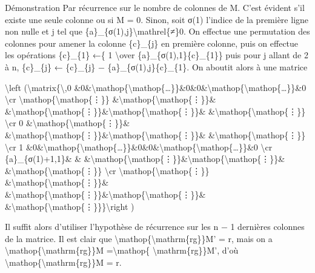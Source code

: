 \documentclass[]{article}
\begin{document}
Démonstration Par récurrence sur le nombre de colonnes de M. C'est
évident s'il existe une seule colonne ou si M = 0. Sinon, soit σ(1)
l'indice de la première ligne non nulle et j tel que
\{a\}\_\{σ(1),j\}\textbackslash{}mathrel\{≠\}0. On effectue une
permutation des colonnes pour amener la colonne \{c\}\_\{j\} en première
colonne, puis on effectue les opérations \{c\}\_\{1\} ←\{ 1
\textbackslash{}over \{a\}\_\{σ(1),1\}\{c\}\_\{1\}\} puis pour j allant
de 2 à n, \{c\}\_\{j\} ← \{c\}\_\{j\} − \{a\}\_\{σ(1),j\}\{c\}\_\{1\}.
On aboutit alors à une matrice

\textbackslash{}left (\textbackslash{}matrix\{\textbackslash{},0
\&0\&\textbackslash{}mathop\{\textbackslash{}mathop\{\ldots{}\}\}\&0\&0\&\textbackslash{}mathop\{\textbackslash{}mathop\{\ldots{}\}\}\&0
\textbackslash{}cr \textbackslash{}mathop\{\textbackslash{}mathop\{⋮\}\}
\&\textbackslash{}mathop\{\textbackslash{}mathop\{⋮\}\}\&
\&\textbackslash{}mathop\{\textbackslash{}mathop\{⋮\}\}\&\textbackslash{}mathop\{\textbackslash{}mathop\{⋮\}\}\&
\&\textbackslash{}mathop\{\textbackslash{}mathop\{⋮\}\}
\textbackslash{}cr 0
\&\textbackslash{}mathop\{\textbackslash{}mathop\{⋮\}\}\&
\&\textbackslash{}mathop\{\textbackslash{}mathop\{⋮\}\}\&\textbackslash{}mathop\{\textbackslash{}mathop\{⋮\}\}\&
\&\textbackslash{}mathop\{\textbackslash{}mathop\{⋮\}\}
\textbackslash{}cr 1
\&0\&\textbackslash{}mathop\{\textbackslash{}mathop\{\ldots{}\}\}\&0\&0\&\textbackslash{}mathop\{\textbackslash{}mathop\{\ldots{}\}\}\&0
\textbackslash{}cr \{a\}\_\{σ(1)+1,1\}\& \&
\&\textbackslash{}mathop\{\textbackslash{}mathop\{⋮\}\}\&\textbackslash{}mathop\{\textbackslash{}mathop\{⋮\}\}\&
\&\textbackslash{}mathop\{\textbackslash{}mathop\{⋮\}\}
\textbackslash{}cr \textbackslash{}mathop\{\textbackslash{}mathop\{⋮\}\}
\&\textbackslash{}mathop\{\textbackslash{}mathop\{⋮\}\}\&
\&\textbackslash{}mathop\{\textbackslash{}mathop\{⋮\}\}\&\textbackslash{}mathop\{\textbackslash{}mathop\{⋮\}\}\&
\&\textbackslash{}mathop\{\textbackslash{}mathop\{⋮\}\}\}\textbackslash{}right
)

Il suffit alors d'utiliser l'hypothèse de récurrence sur les n − 1
dernières colonnes de la matrice. Il est clair que
\textbackslash{}mathop\{\textbackslash{}mathrm\{rg\}\}M' = r, mais on a
\textbackslash{}mathop\{\textbackslash{}mathrm\{rg\}\}M
=\textbackslash{}mathop\{ \textbackslash{}mathrm\{rg\}\}M', d'où
\textbackslash{}mathop\{\textbackslash{}mathrm\{rg\}\}M = r.
\end{document}
